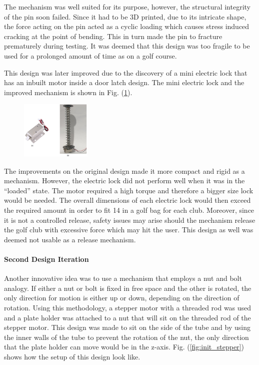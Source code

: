 \documentclass[11pt,landscape]{article}
\begin{document}
\begin{multicols}{3}
The mechanism was well suited for its purpose, however, the structural integrity
of the pin soon failed. Since it had to be 3D printed, due to its intricate
shape, the force acting on the pin acted as a cyclic loading which causes stress
induced cracking at the point of bending. This in turn made the pin to fracture
prematurely during testing. It was deemed that this design was too fragile to be
used for a prolonged amount of time as on a golf course.

This design was later improved due to the discovery of a mini electric lock that
has an inbuilt motor inside a door latch design. The mini electric lock and the
improved mechanism is shown in Fig. (\ref{fig:improv_release_mech}).

\begin{figure}[H]
    \begin{center}
        \includegraphics[width=0.3\textwidth]{Improv Release Mech.PNG}
        \label{fig:improv_release_mech}
    \end{center}
\end{figure}

The improvements on the original design made it more compact and rigid as a
mechanism. However, the electric lock did not perform well when it was in the
“loaded” state. The motor required a high torque and therefore a bigger size
lock would be needed. The overall dimensions of each electric lock would then
exceed the required amount in order to fit 14 in a golf bag for each club.
Moreover, since it is not a controlled release, safety issues may arise should
the mechanism release the golf club with excessive force which may hit the user.
This design as well was deemed not usable as a release mechanism.

\paragraph{Second Design Iteration}
Another innovative idea was to use a mechanism that employs a nut and bolt
analogy. If either a nut or bolt is fixed in free space and the other is
rotated, the only direction for motion is either up or down, depending on the
direction of rotation. Using this methodology, a stepper motor with a threaded
rod was used and a plate holder was attached to a nut that will sit on the
threaded rod of the stepper motor. This design was made to sit on the side of
the tube and by using the inner walls of the tube to prevent the rotation of the
nut, the only direction that the plate holder can move would be in the z-axis.
Fig. (\ref{fig:init_stepper}) shows how the setup of this design look
like. 


\end{multicols}
\end{document}
